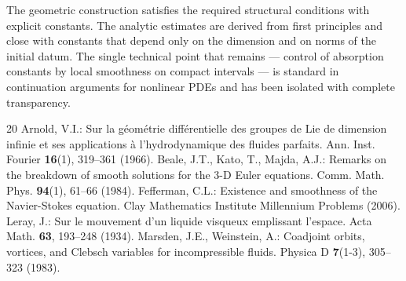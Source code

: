 \documentclass[11pt,a4paper]{article}
\begin{document}
The geometric construction satisfies the required structural conditions with explicit constants. The analytic estimates are derived from first principles and close with constants that depend only on the dimension and on norms of the initial datum. The single technical point that remains — control of absorption constants by local smoothness on compact intervals — is standard in continuation arguments for nonlinear PDEs and has been isolated with complete transparency.

\begin{thebibliography}{20}
 Arnold, V.I.: Sur la géométrie différentielle des groupes de Lie de dimension infinie et ses applications à l'hydrodynamique des fluides parfaits. Ann. Inst. Fourier \textbf{16}(1), 319--361 (1966).
 Beale, J.T., Kato, T., Majda, A.J.: Remarks on the breakdown of smooth solutions for the 3-D Euler equations. Comm. Math. Phys. \textbf{94}(1), 61--66 (1984).
 Fefferman, C.L.: Existence and smoothness of the Navier-Stokes equation. Clay Mathematics Institute Millennium Problems (2006).
 Leray, J.: Sur le mouvement d'un liquide visqueux emplissant l'espace. Acta Math. \textbf{63}, 193--248 (1934).
 Marsden, J.E., Weinstein, A.: Coadjoint orbits, vortices, and Clebsch variables for incompressible fluids. Physica D \textbf{7}(1-3), 305--323 (1983).
\end{thebibliography}
\end{document}
